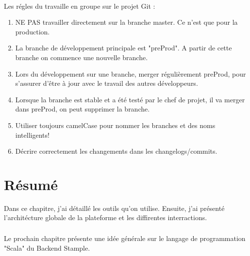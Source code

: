 \paragraph{}
Les régles du travaille en groupe sur le projet Git :
\begin{enumerate}
\item NE PAS travailler directement sur la branche master. Ce n'est que pour la production.
\item La branche de développement principale est "preProd". A partir de cette branche on commence une nouvelle branche. 
\item Lors du développement sur une branche, merger régulièrement preProd, pour s'assurer d'être à jour avec le travail des autres développeurs.
\item Lorsque la branche est stable et a été testé par le chef de projet, il va merger dans preProd, on peut supprimer la branche.
\item Utiliser toujours camelCase pour nommer les branches et des noms intelligents!
\item Décrire correctement les changements dans les changelogs/commits.
\end{enumerate}
\newpage
\section{Résumé}
\paragraph{}
Dans ce chapitre, j'ai détaillé les outils qu'on utilise. Ensuite, j'ai présenté l'architécture globale de la plateforme et les diffirentes interractions. 
\subparagraph{}
Le prochain chapitre présente une idée générale sur le langage de programmation "Scala" du Backend Stample. 
